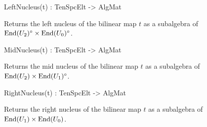 \begin{intrinsics}
LeftNucleus(t) : TenSpcElt -> AlgMat
\end{intrinsics}

Returns the left nucleus of the bilinear map $t$ as a subalgebra of $\operatorname{End}(U_2)^\circ\times \operatorname{End}(U_0)^\circ$.

\begin{intrinsics}
MidNucleus(t) : TenSpcElt -> AlgMat
\end{intrinsics}

Returns the mid nucleus of the bilinear map $t$ as a subalgebra of $\operatorname{End}(U_2)\times \operatorname{End}(U_1)^\circ$.

\begin{intrinsics}
RightNucleus(t) : TenSpcElt -> AlgMat
\end{intrinsics}

Returns the right nucleus of the bilinear map $t$ as a subalgebra of $\operatorname{End}(U_1)\times \operatorname{End}(U_0)$.

